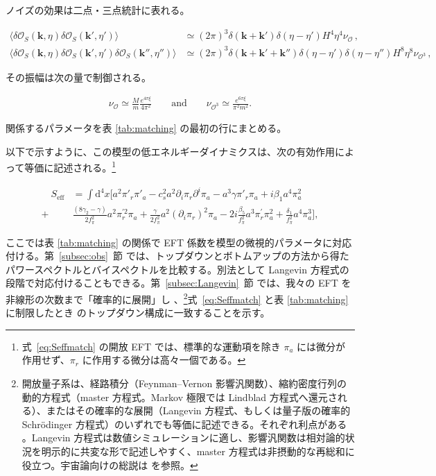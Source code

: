 \documentclass[a4paper,11pt]{ltjsarticle}
\numberwithin{equation}{section}
\def\pia{\pi_{a}}
\def\pir{\pi_{r}}
\newcommand{\dd}{\mathrm{d}}
\newcommand{\ee}{e}
\newcommand{\boldmathsymbol}[1]{{\ensuremath{\boldsymbol{#1}}}}
\newcommand{\bmk}{\boldmathsymbol{k}}
\newcommand{\Eq}[1]{Eq.~(\ref{#1})}
\newcommand{\Sec}[1]{Sec.~\ref{#1}}
\def\bmk{{\boldsymbol{k}}}
\renewcommand{\Eq}[1]{式~\eqref{#1}}
\renewcommand{\Sec}[1]{第~\ref{#1}~節}
\begin{document}
ノイズの効果は二点・三点統計に表れる。

\begin{align}
\langle  \delta \mathcal{O}_S(\bmk, \eta) \delta \mathcal{O}_S(\bmk',\eta')\rangle &\simeq (2\pi)^3 \delta(\bmk + \bmk') \delta(\eta - \eta')H^4 \eta^4 \nu_{\mathcal{O}}\,, \\
\langle  \delta \mathcal{O}_S(\bmk, \eta) \delta \mathcal{O}_S(\bmk',\eta')  \delta \mathcal{O}_S(\bmk'',\eta'')\rangle &\simeq (2\pi)^3 \delta(\bmk + \bmk' +\bmk'') \delta(\eta - \eta') \delta(\eta - \eta'')H^8 \eta^8 \nu_{\mathcal{O}^3} \,,\label{eq:NGnoiseCrem}
\end{align}

その振幅は次の量で制御される。

\begin{align}
\nu_{\mathcal{O}} \simeq \frac{M}{m} \frac{\ee^{4\pi \xi}}{4\pi^2} \qquad \mathrm{and} \qquad \nu_{\mathcal{O}^3} \simeq \frac{\ee^{6\pi \xi}}{\pi^2 m^2} .
\end{align}

関係するパラメータを表 \ref{tab:matching} の最初の行にまとめる。

以下で示すように、この模型の低エネルギーダイナミクスは、次の有効作用によって等価に記述される。\footnote{\Eq{eq:Seffmatch} の開放 EFT では、標準的な運動項を除き $\pia$ には微分が作用せず、$\pir$ に作用する微分は高々一個である。}

\begin{align}\label{eq:Seffmatch}
\quad S_{\mathrm{eff}} &= \int \dd^4 x \Big[ a^2 \pi'_{r} \pi'_{a} - c_{s}^{2} a^2 \partial_i \pir  \partial^i \pia   -  a^3 \gamma \pi'_{r} \pia + i \beta_1 a^4 \pia^2 \nonumber \\
+ &\frac{ \left(8\gamma_2 - \gamma\right)}{2f^{2}_{\pi}}  a^2\pir^{\prime2} \pia	+ \frac{\gamma}{2f_{\pi}^{2}} a^2	\left(\partial_i \pir \right)^2 \pia - 2i\frac{\beta_{5}}{f_\pi^2} a^3 \pir^{\prime} \pia^2 +\frac{\delta_1}{f_\pi^2} a^4 \pia^3  \Big],
\end{align}

ここでは表 \ref{tab:matching} の関係で EFT 係数を模型の微視的パラメータに対応付ける。\Sec{subsec:obs} では、トップダウンとボトムアップの方法から得たパワースペクトルとバイスペクトルを比較する。別法として Langevin 方程式の段階で対応付けることもできる。\Sec{subsec:Langevin} では、我々の EFT を非線形の次数まで「確率的に展開」し \cite{breuerTheoryOpenQuantum2002}、\footnote{開放量子系は、経路積分（Feynman--Vernon 影響汎関数）、縮約密度行列の動的方程式（master 方程式。Markov 極限では Lindblad 方程式へ還元される）、またはその確率的な展開（Langevin 方程式、もしくは量子版の確率的 Schr\"odinger 方程式）のいずれでも等価に記述できる。それぞれ利点がある \cite{breuerTheoryOpenQuantum2002}。Langevin 方程式は数値シミュレーションに適し、影響汎関数は相対論的状況を明示的に共変な形で記述しやすく、master 方程式は非摂動的な再総和に役立つ。宇宙論向けの総説は \cite{Colas:2023wxa} を参照。}\Eq{eq:Seffmatch} と表 \ref{tab:matching} に制限したとき \cite{Creminelli:2023aly} のトップダウン構成に一致することを示す。
\end{document}
